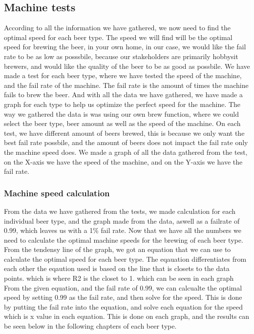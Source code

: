 \subsection{Machine tests}
According to all the information we have gathered, we now need to find the optimal speed for each beer type. The speed we will find will be the optimal speed for brewing the beer, in your own home, in our case,
we would like the fail rate to be as low as posssbile, because our stakeholders are primarily hobbysit brewers, and would like the quality of the beer to be as good as possbile.
We have made a test for each beer type, where we have tested the speed of the machine, and the fail rate of the machine. The fail rate is the amount of times the machine fails to brew the beer.
And with all the data we have gathered, we have made a graph for each type to help us optimize the perfect speed for the machine. \newline
The way we gathered the data is was using our own brew function, where we could select the beer type, beer amount as well as the speed of the machine. On each test, we have different amount of beers brewed, this is because we only want the best fail rate possbile, and the amount of beers does not impact the fail rate only the machine speed does.
We made a graph of all the data gathered from the test, on the X-axis we have the speed of the machine, and on the Y-axis we have the fail rate. \newline

\subsubsection{Machine speed calculation}
From the data we have gathered from the tests, we made calculation for each individual beer type, and the graph made from the data, aswell as a failrate of 0.99, 
which leaves us with a 1\% fail rate. Now that we have all the numbers we need to calculate the optimal machine speeds for the brewing of each beer type. \newline
From the tendensy line of the graph, we got an equation that we can use to calculate the optimal speed for each beer type. The eqauation differentiates from each other the eqaution used is based on the line that is closets to the data points. which is where R2 is the closet to 1. which can be seen in each graph \newline
From the given equation, and the fail rate of 0.99, we can calcualte the optimal speed by setting 0.99 as the fail rate, and then solve for the speed. This is done by putting the fail rate into the equation, and solve each equation for the speed which is x value in each equation. \newline
This is done on each graph, and the results can be seen below in the following chapters of each beer type. \newline



